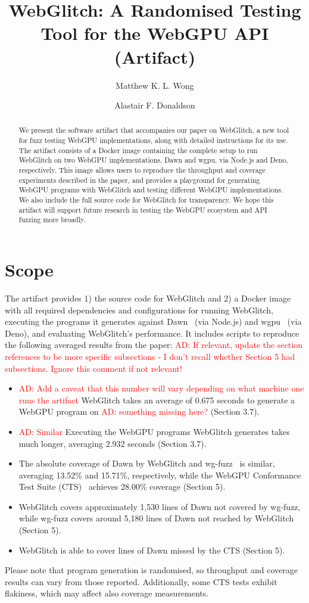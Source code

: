 \documentclass[a4paper,UKenglish]{darts-v2021}
\title{WebGlitch: A Randomised Testing Tool for the WebGPU API (Artifact)} %
\author{Matthew K. L. Wong}{Department of Computing, Imperial College London, United Kingdom}{kwok.wong19@imperial.ac.uk}{https://orcid.org/0009-0004-2776-5430}{}
\author{Alastair F. Donaldson}{Department of Computing, Imperial College London, United Kingdom}{alastair.donaldson@imperial.ac.uk}{https://orcid.org/0000-0002-7448-7961}{}
\newenvironment{scope}{\section{Scope}}{}
\newcommand{\AD}[1]{\textcolor{red}{AD: #1}}
\begin{document}
\maketitle

\begin{abstract}
We present the software artifact that accompanies our paper on WebGlitch, a new tool for fuzz testing WebGPU implementations, along with detailed instructions for its use.
The artifact consists of a Docker image containing the complete setup to run WebGlitch on two WebGPU implementations, Dawn and wgpu, via Node.js and Deno, respectively.
This image allows users to reproduce the throughput and coverage experiments described in the paper, and provides a playground for generating WebGPU programs with WebGlitch and testing different WebGPU implementations. 
We also include the full source code for WebGlitch for transparency.
We hope this artifact will support future research in testing the WebGPU ecosystem and API fuzzing more broadly.
 \end{abstract}


\begin{scope}
The artifact provides 1) the source code for WebGlitch and 2) a Docker image with all required dependencies and configurations for running WebGlitch, executing the programs it generates against Dawn~\cite{dawn} (via Node.js) and wgpu~\cite{wgpu} (via Deno), and evaluating WebGlitch's performance. 
It includes scripts to reproduce the following averaged results from the paper: \AD{If relevant, update the section references to be more specific subsections - I don't recall whether Section 5 had subsections. Ignore this comment if not relevant!}
\begin{itemize}
    \item \AD{Add a caveat that this number will vary depending on what machine one runs the artifact} WebGlitch takes an average of 0.675 seconds to generate a WebGPU program on \AD{something missing here?} (Section 3.7). 
    \item \AD{Similar} Executing the WebGPU programs WebGlitch generates takes much longer, averaging 2.932 seconds (Section 3.7).
    \item The absolute coverage of Dawn by WebGlitch and wg-fuzz~\cite{wgfuzz} is similar, averaging 13.52\% and 15.71\%, respectively, while the WebGPU Conformance Test Suite (CTS)~\cite{cts} achieves 28.00\% coverage (Section 5). 
    \item WebGlitch covers approximately 1,530 lines of Dawn not covered by wg-fuzz, while wg-fuzz covers around 5,180 lines of Dawn not reached by WebGlitch (Section 5). 
    \item WebGlitch is able to cover lines of Dawn missed by the CTS (Section 5).
\end{itemize}
Please note that program generation is randomised, so throughput and coverage results can vary from those reported.
Additionally, some CTS tests exhibit flakiness, which may affect also coverage measurements.
\end{scope}
\end{document}
